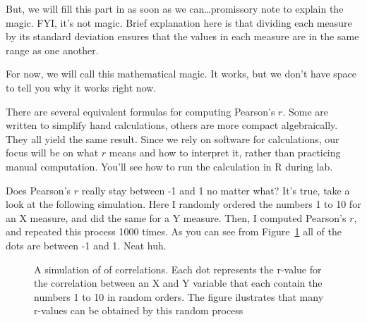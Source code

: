 \documentclass[
  letterpaper,
  DIV=11,
  numbers=noendperiod]{scrreprt}
\begin{document}
\begin{tcolorbox}[enhanced jigsaw, title=\textcolor{quarto-callout-note-color}{\faInfo}\hspace{0.5em}{Note}, colframe=quarto-callout-note-color-frame, colbacktitle=quarto-callout-note-color!10!white, bottomtitle=1mm, leftrule=.75mm, rightrule=.15mm, titlerule=0mm, arc=.35mm, colback=white, opacitybacktitle=0.6, toprule=.15mm, toptitle=1mm, bottomrule=.15mm, coltitle=black, breakable, left=2mm, opacityback=0]

But, we will fill this part in as soon as we can\ldots promissory note
to explain the magic. FYI, it's not magic. Brief explanation here is
that dividing each measure by its standard deviation ensures that the
values in each measure are in the same range as one another.

\end{tcolorbox}

For now, we will call this mathematical magic. It works, but we don't
have space to tell you why it works right now.

There are several equivalent formulas for computing Pearson's \(r\).
Some are written to simplify hand calculations, others are more compact
algebraically. They all yield the same result. Since we rely on software
for calculations, our focus will be on what \(r\) means and how to
interpret it, rather than practicing manual computation. You'll see how
to run the calculation in R during lab.

Does Pearson's \(r\) really stay between -1 and 1 no matter what? It's
true, take a look at the following simulation. Here I randomly ordered
the numbers 1 to 10 for an X measure, and did the same for a Y measure.
Then, I computed Pearson's \(r\), and repeated this process 1000 times.
As you can see from Figure~\ref{fig-3onethousandr} all of the dots are
between -1 and 1. Neat huh.

\begin{figure}


\caption{\label{fig-3onethousandr}A simulation of of correlations. Each
dot represents the r-value for the correlation between an X and Y
variable that each contain the numbers 1 to 10 in random orders. The
figure ilustrates that many r-values can be obtained by this random
process}

\end{figure}%
\end{document}
